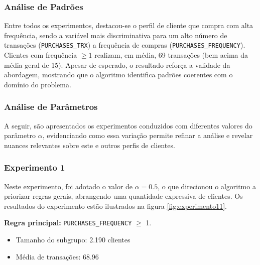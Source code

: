 \documentclass[12pt]{article}
\begin{document}
\subsubsection{Análise de Padrões}

\hspace{1.2cm}Entre todos os experimentos, destacou-se o perfil de cliente que compra com alta frequência, sendo a variável mais discriminativa para um alto número de transações (\texttt{PURCHASES\_TRX}) a frequência de compras (\texttt{PURCHASES\_FREQUENCY}). Clientes com frequência $\geq 1$ realizam, em média, 69 transações (bem acima da média geral de 15). Apesar de esperado, o resultado reforça a validade da abordagem, mostrando que o algoritmo identifica padrões coerentes com o domínio do problema.

\subsubsection{Análise de Parâmetros}

\hspace{1.2cm}A seguir, são apresentados os experimentos conduzidos com diferentes valores do parâmetro $\alpha$, evidenciando como essa variação permite refinar a análise e revelar nuances relevantes sobre este e outros perfis de clientes.

\subsubsection*{Experimento 1} \label{sec:exp1}

\hspace{1.2cm}Neste experimento, foi adotado o valor de $\alpha = 0.5$, o que direcionou o algoritmo a priorizar regras gerais, abrangendo uma quantidade expressiva de clientes. Os resultados do experimento estão ilustrados na figura \ref{fig:experimento11}.

\textbf{Regra principal:} \texttt{PURCHASES\_FREQUENCY} $\geq$ 1.

\begin{itemize}
    \item Tamanho do subgrupo: 2.190 clientes
    \item Média de transações: 68.96
\end{itemize}
\end{document}
